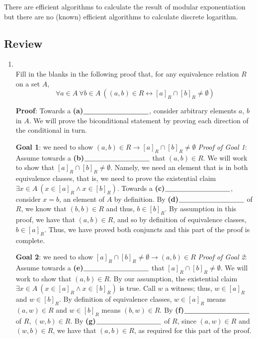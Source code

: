 \documentclass[12pt, oneside]{article}
\begin{document}
There are efficient algorithms to calculate the result of modular exponentiation 
but there are no (known) efficient algorithms to calculate discrete logarithm. \newpage
\subsection*{Review}
\begin{enumerate}
    \item \hspace{1in}\\ 

Fill in the blanks in the following proof that, for any equivalence relation $R$ on a set $A$,
\[
\forall a \in A ~\forall b \in A~\left( (a,b) \in R \leftrightarrow [a]_R\cap [b]_R \neq \emptyset \right)
\]

{\bf Proof}: Towards a  \textbf{(a)}$\underline{\phantom{\hspace{1.3in}}}$, consider arbitrary elements $a$, $b$ in $A$. We will 
prove the biconditional statement by proving each direction of the conditional in turn.

{\bf Goal 1}: we need to show $(a,b) \in R \to [a]_R\cap [b]_R \neq \emptyset$
{\it Proof of Goal 1}: Assume towards a \textbf{(b)}$\underline{\phantom{\hspace{1.3in}}}$ 
that $(a,b) \in R$. We will work to show
that $[a]_R\cap [b]_R \neq \emptyset$. Namely, we need an element that is in both equivalence classes, that is, we
 need to prove the existential claim $\exists x \in A ~(x \in [a]_{R} \land x \in [b]_{R})$. 
 Towards a \textbf{(c)}$\underline{\phantom{\hspace{1.3in}}}$, consider $x = b$, 
 an element of $A$ by definition. By \textbf{(d)}$\underline{\phantom{\hspace{1.3in}}}$  of $R$, we know that $(b,b) \in R$ 
 and thus, $b \in [b]_{R}$.
 By assumption in this proof, we have that $(a,b) \in R$, and so by  definition of equivalence classes, $b \in [a]_R$.
 Thus, we have proved both conjuncts and this part of the proof is complete.
 
{\bf Goal 2}: we need to show $[a]_R\cap [b]_R \neq \emptyset \to (a,b) \in R $
{\it Proof of Goal 2}: Assume towards a \textbf{(e)}$\underline{\phantom{\hspace{1.3in}}}$ 
that $[a]_R\cap [b]_R \neq \emptyset $. We will work to show
that $(a,b) \in R$. By our assumption, the existential claim $\exists x \in A ~(x \in [a]_{R} \land x \in [b]_{R})$
is true. Call $w$ a witness; thus, $w \in [a]_R$ and $w \in [b]_R$. 
By  definition of equivalence classes, $w \in [a]_R$ means $(a,w) \in R$ and $w \in [b]_R$ means $(b,w) \in R$.
By \textbf{(f)}$\underline{\phantom{\hspace{1.3in}}}$  of $R$, $(w,b) \in R$. By 
\textbf{(g)}$\underline{\phantom{\hspace{1.3in}}}$ of $R$, since $(a,w) \in R$ and $(w,b) \in R$, we have that
$(a,b) \in R$, as required for  this part of the proof.
 

\end{enumerate}
\end{document}
